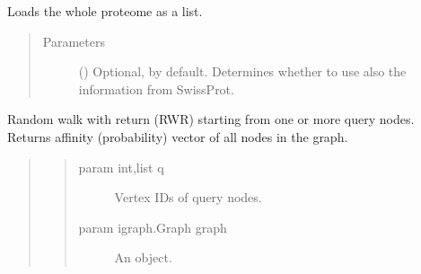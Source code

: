 \documentclass[letterpaper,10pt,english]{sphinxmanual}
\begin{document}
\begin{fulllineitems}

\begin{fulllineitems}
\label{\detokenize{reference:pypath.main.PyPath.proteome_list}}
Loads the whole proteome as a list.
\begin{quote}\begin{description}
\item[{Parameters}] \leavevmode
{} () \textendash{} Optional,  by default. Determines whether to use
also the information from SwissProt.

\end{description}\end{quote}

\end{fulllineitems}


\begin{fulllineitems}
\label{\detokenize{reference:pypath.main.PyPath.ps}}
\end{fulllineitems}


\begin{fulllineitems}
\label{\detokenize{reference:pypath.main.PyPath.random_walk_with_return}}
Random walk with return (RWR) starting from one or more query nodes.
Returns affinity (probability) vector of all nodes in the graph.
\begin{quote}
\begin{quote}\begin{description}
\item[{param int,list q}] \leavevmode
Vertex IDs of query nodes.

\item[{param igraph.Graph graph}] \leavevmode
An  object.


\end{description}
\end{quote}
\end{quote}
\end{fulllineitems}
\end{fulllineitems}
\end{document}
